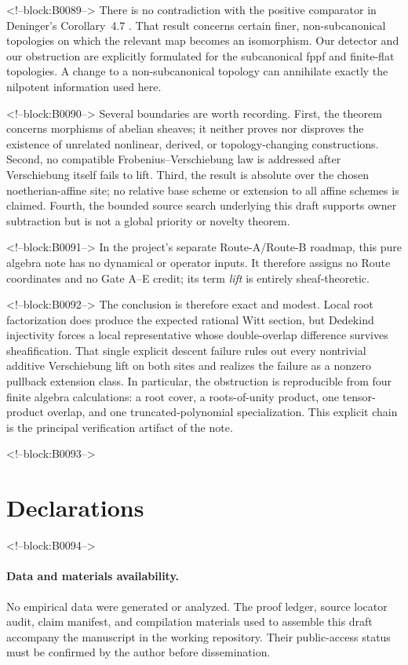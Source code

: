 \documentclass[11pt]{article}
\theoremstyle{definition}
\begin{document}
<!--block:B0089-->
There is no contradiction with the positive comparator in Deninger's
Corollary~4.7 \cite[p.~24]{Deninger2025Rational}.  That result concerns
certain finer, non-subcanonical topologies on which the relevant map
becomes an isomorphism.  Our detector and our obstruction are explicitly
formulated for the subcanonical fppf and finite-flat topologies.  A change
to a non-subcanonical topology can annihilate exactly the nilpotent
information used here.

<!--block:B0090-->
Several boundaries are worth recording.  First, the theorem concerns
morphisms of abelian sheaves; it neither proves nor disproves the existence
of unrelated nonlinear, derived, or topology-changing constructions.
Second, no compatible Frobenius--Verschiebung law is addressed after
Verschiebung itself fails to lift.  Third, the result is absolute over the
chosen noetherian-affine site; no relative base scheme or extension to all
affine schemes is claimed.  Fourth, the bounded source search underlying
this draft supports owner subtraction but is not a global priority or
novelty theorem.

<!--block:B0091-->
In the project's separate Route-A/Route-B roadmap, this pure algebra note
has no dynamical or operator inputs.  It therefore assigns no Route
coordinates and no Gate A--E credit; its term \emph{lift} is entirely
sheaf-theoretic.

<!--block:B0092-->
The conclusion is therefore exact and modest.  Local root factorization
does produce the expected rational Witt section, but Dedekind injectivity
forces a local representative whose double-overlap difference survives
sheafification.  That single explicit descent failure rules out every
nontrivial additive Verschiebung lift on both sites and realizes the
failure as a nonzero pullback extension class.
In particular, the obstruction is reproducible from four finite algebra
calculations: a root cover, a roots-of-unity product, one tensor-product
overlap, and one truncated-polynomial specialization.  This explicit chain
is the principal verification artifact of the note.

<!--block:B0093-->
\section*{Declarations}

<!--block:B0094-->
\paragraph{Data and materials availability.}
No empirical data were generated or analyzed.  The proof ledger, source
locator audit, claim manifest, and compilation materials used to assemble
this draft accompany the manuscript in the working repository.  Their
public-access status must be confirmed by the author before dissemination.
\end{document}
